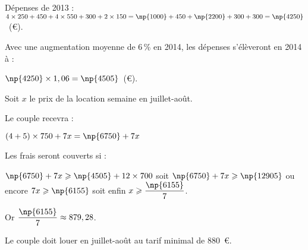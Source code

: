 %
% 
%
% 
%
%
%
%
% 
% 
Dépenses de 2013 : $4 \times 250 + 450 + 4 \times 550 + 300 + 2 \times 150 = \np{1000} + 450 + \np{2200} + 300 + 300 = \np{4250}$~(\euro).

Avec une augmentation moyenne de 6\,\% en 2014, les dépenses s'élèveront en 2014 à  : 

$\np{4250} \times 1,06 = \np{4505}$~(\euro).

Soit $x$ le prix de la location semaine en juillet-août.

Le couple recevra :

$(4 + 5) \times 750 + 7x = \np{6750} + 7x$

Les frais seront couverts si :

$\np{6750} + 7x \geqslant \np{4505} + 12 \times 700$ soit $\np{6750} + 7x \geqslant \np{12905}$ ou encore  $7x \geqslant \np{6155}$ soit enfin $x \geqslant \dfrac{\np{6155}}{7}$.

Or $\dfrac{\np{6155}}{7} \approx 879,28$.

Le couple doit louer en juillet-août au tarif minimal de 880~\euro.


